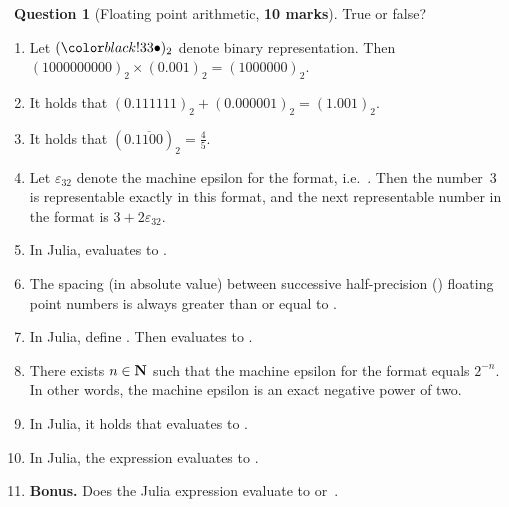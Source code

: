 \documentclass[10pt]{article}
\theoremstyle{definition}
\newtheorem{question}{{\normalfont \faGears}~Question}
\renewcommand{\mymarks}[1]{\textbf{#1 marks}}
\begin{document}
\newpage
\begin{question}
    [Floating point arithmetic, \mymarks{10}]
    True or false?
    \begin{enumerate}
        \item Let $(\placeholder)_2$ denote binary representation.
            Then
            \(
                (1000000000)_2 \times (0.001)_2 = (1000000)_2.
            \)

        \item It holds that
            \(
                (0.111111)_2 + (0.000001)_2 = (1.001)_2.
            \)

        \item
            It holds that $(0.\overline{1100})_2 = \frac{4}{5}$.

        \item
            Let $\varepsilon_{32}$ denote the machine epsilon for the  format,
            i.e.\ .
            Then the number~3 is representable exactly in this format,
            and the next representable number in the  format is $3 + 2\varepsilon_{32}$.

        \item
            In Julia,  evaluates to .

        \item
            The spacing (in absolute value) between successive half-precision () floating point numbers is always greater than or equal to .

        \item
            In Julia, define .
            Then  evaluates to .

        \item
            There exists $n \in \mathbf N$ such that the machine epsilon for the  format equals $2^{-n}$.
            In other words, the machine epsilon is an exact negative power of two.

        \item
            In Julia, it holds that  evaluates to .

        \item
            In Julia, the expression  evaluates to .

        \item
            \textbf{Bonus.}
            Does the Julia expression  evaluate to  or~.


\end{enumerate}
\end{question}
\end{document}
